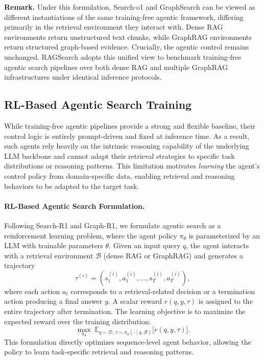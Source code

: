 \noindent\textbf{Remark.}
Under this formulation, Search-o1 and GraphSearch can be viewed as different instantiations of the same training-free agentic framework, differing primarily in the retrieval environment they interact with. Dense RAG environments return unstructured text chunks, while GraphRAG environments return structured graph-based evidence. Crucially, the agentic control remains unchanged. RAGSearch adopts this unified view to benchmark training-free agentic search pipelines over both dense RAG and multiple GraphRAG infrastructures under identical inference protocols.

\subsection{RL-Based Agentic Search Training}
\label{sec:rl_agents}

While training-free agentic pipelines provide a strong and flexible baseline, their control logic is entirely prompt-driven and fixed at inference time. As a result, such agents rely heavily on the intrinsic reasoning capability of the underlying LLM backbone and cannot adapt their retrieval strategies to specific task distributions or reasoning patterns. This limitation motivates \emph{learning} the agent’s control policy from domain-specific data, enabling retrieval and reasoning behaviors to be adapted to the target task.

\paragraph{\textbf{RL-Based Agentic Search Formulation}.}
Following Search-R1 and Graph-R1, we formulate agentic search as a reinforcement learning problem, where the agent policy $\pi_\theta$ is parameterized by an LLM with trainable parameters $\theta$. Given an input query $q$, the agent interacts with a retrieval environment $\mathcal{B}$ (dense RAG or GraphRAG) and generates a trajectory
\[
\tau^{(i)} = (s^{(i)}_1, a^{(i)}_1, \dots, s^{(i)}_T, a^{(i)}_T),
\]
where each action $a_t$ corresponds to a retrieval-related decision or a termination action producing a final answer $y$. A scalar reward $r(q, y, \tau)$ is assigned to the entire trajectory after termination. The learning objective is to maximize the expected reward over the training distribution:
\begin{equation}
\max_{\pi_\theta} \;
\mathbb{E}_{q \sim \mathcal{D},\, \tau \sim \pi_\theta(\cdot \mid q, \mathcal{B})}
\big[ r(q, y, \tau) \big].
\end{equation}
This formulation directly optimizes sequence-level agent behavior, allowing the policy to learn task-specific retrieval and reasoning patterns.

